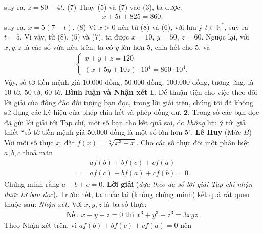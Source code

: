\begin{multicols}{2}
	suy ra, $z = 80 - 4t$. \hfill ($7$)
	\vskip 0.05cm
	Thay ($5$) và ($7$) vào ($3$), ta được:
	\begin{align*}
		x + 5t + 825 = 860;
	\end{align*}
	suy ra,  $x = 5 (7-t)$. \hfill ($8$)
	\vskip 0.05cm
	Vì $x > 0$ nên từ ($8$) và ($6$), với lưu ý $t \in \mathbb{N^*}$,  suy ra $t = 5$. Vì vậy, từ ($8$), ($5$) và ($7$), ta được $x = 10$, $y = 50$, $z = 60$.
	\vskip 0.05cm
	Ngược lại, với $x, y, z$ là các số vừa nêu trên, ta có $y$ lớn hơn $5$, chia hết cho $5$, và
	\begin{align*}
		\begin{cases}
			x + y + z = 120\\[-0.5ex]
			(x + 5y + 10z) \cdot 10^4 = 860 \cdot 10^4.
		\end{cases}
	\end{align*}
	Vậy, số tờ tiền mệnh giá $10{.}000$ đồng, $50{.}000$ đồng, $100{.}000$ đồng, tương ứng, là $10$ tờ, $50$ tờ, $60$ tờ.
	\vskip 0.05cm
	\textbf{\color{thachthuctoanhoc}Bình luận và Nhận xét}
	\vskip 0.05cm	
	$\pmb{1.}$ Để thuận tiện cho việc theo dõi lời giải của đông đảo đối tượng bạn đọc, trong lời giải trên, chúng tôi đã không sử dụng các ký hiệu của phép chia hết và phép đồng dư.
	\vskip 0.05cm
	$\pmb{2.}$ Trong số các bạn đọc đã gửi lời giải tới Tạp chí, một số bạn cho kết quả sai, do \textit{không} lưu ý tới giả thiết ``số tờ tiền mệnh giá $50{.}000$ đồng là một số lớn hơn $5$".
	\vskip 0.05cm
	\hfill	\textbf{\color{thachthuctoanhoc}Lê Huy}
	\vskip 0.05cm
	{}
	(Mức $B$) Với mỗi số thực $x$, đặt $f(x)=\sqrt[3]{x^3-x}$. Cho các số thực đôi một phân biệt $a,b,c$ thoả mãn
	\begin{align*}
		&a f(b)+b f(c)+c f(a)\\[-0.5ex]
		=\,\,&a f(c)+b f(a)+c f(b)=0.
	\end{align*}
	Chứng minh rằng $a+b+c=0$. 
	\vskip 0.05cm
	\textbf{\color{thachthuctoanhoc}Lời giải} (\textit{dựa theo đa số lời giải Tạp chí nhận được từ bạn đọc})\textbf{\color{thachthuctoanhoc}.}
	\vskip 0.05cm
	Trước hết, ta nhắc lại (không chứng minh) kết quả rất quen thuộc sau:
	\vskip 0.05cm
	\textit{Nhận xét.} Với $x, y, z$ là ba số thực: 
	\begin{align*}
		\text{Nếu } x + y + z = 0 \text{ thì } {x^3} + {y^3} + {z^3} = 3xyz.   
	\end{align*}
	Theo Nhận xét trên, vì $af\left( b \right) + bf\left( c \right) + cf\left( a \right) = 0$  nên
	\begin{align*}

\end{align*}
\end{multicols}
